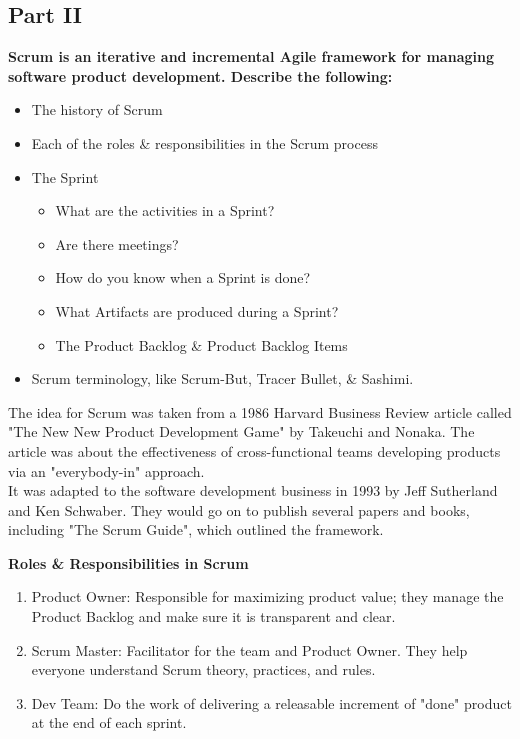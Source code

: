 \documentclass{article}
\begin{document}
\subsection*{Part II}

\textbf{Scrum is an iterative and incremental Agile framework for managing software product development. Describe the following:}
\begin{itemize}
    \item The history of Scrum
    \item Each of the roles \& responsibilities in the Scrum process
    \item The Sprint
    \begin{itemize}
        \item What are the activities in a Sprint?
        \item Are there meetings?
        \item How do you know when a Sprint is done?
        \item What Artifacts are produced during a Sprint?
        \item The Product Backlog \& Product Backlog Items
    \end{itemize}
    \item Scrum terminology, like Scrum-But, Tracer Bullet, \& Sashimi.
\end{itemize}

The idea for Scrum was taken from a 1986 Harvard Business Review article called "The New New Product Development Game" by Takeuchi and Nonaka. The article was about the effectiveness of cross-functional teams developing products via an "everybody-in" approach.\\ 

It was adapted to the software development business in 1993 by Jeff Sutherland and Ken Schwaber. They would go on to publish several papers and books, including "The Scrum Guide", which outlined the framework. 

\textbf{Roles \& Responsibilities in Scrum}
\begin{enumerate}
    \item Product Owner: Responsible for maximizing product value; they manage the Product Backlog and make sure it is transparent and clear.
    \item Scrum Master: Facilitator for the team and Product Owner. They help everyone understand Scrum theory, practices, and rules. 
    \item Dev Team: Do the work of delivering a releasable increment of "done" product at the end of each sprint. 
\end{enumerate}
\end{document}
